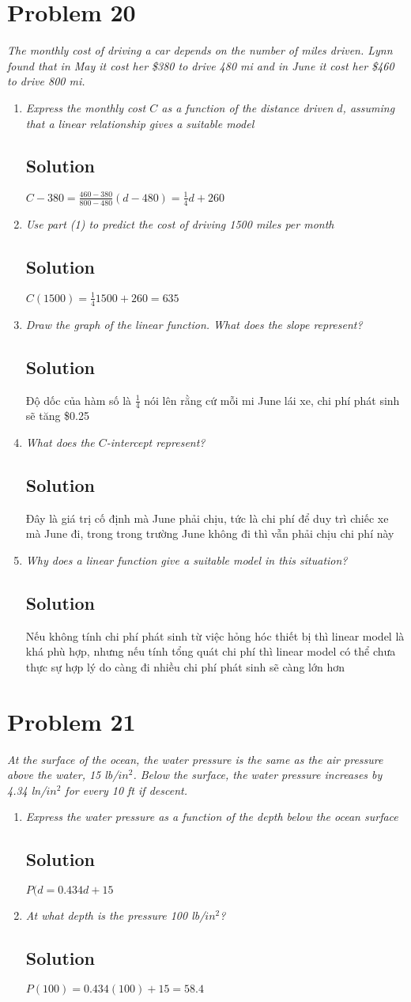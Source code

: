 \documentclass[11pt]{article}
\newcommand{\soln}{\subsection*}
\newcommand{\qn}{\textit}
\begin{document}
\section*{Problem 20}

\qn{The monthly cost of driving a car depends on the number of miles driven. Lynn found that in May it cost her \$380 to drive 480 mi and in June it cost her \$460 to drive 800 mi.}

\begin{enumerate}
	\item \qn{Express the monthly cost $C$ as a function of the distance driven $d$, assuming that a linear relationship gives a suitable model}
	\soln{Solution}
	$C-380=\frac{460-380}{800-480}(d-480)=\frac{1}{4}d+260$
	
	\item \qn{Use part (1) to predict the cost of driving 1500 miles per month}
	\soln{Solution}
	$C(1500)=\frac{1}{4}1500+260=635$
	
	\item \qn{Draw the graph of the linear function. What does the slope represent?}
	\soln{Solution}
	Độ dốc của hàm số là $\frac{1}{4}$ nói lên rằng cứ mỗi mi June lái xe, chi phí phát sinh sẽ tăng \$0.25
	
	\item \qn{What does the $C$-intercept represent?}
	\soln{Solution}
	Đây là giá trị cố định mà June phải chịu, tức là chi phí để duy trì chiếc xe mà June đi, trong trong trường June không đi thì vẫn phải chịu chi phí này
	
	\item \qn{Why does a linear function give a suitable model in this situation?}
	\soln{Solution}
	Nếu không tính chi phí phát sinh từ việc hỏng hóc thiết bị thì linear model là khá phù hợp, nhưng nếu tính tổng quát chi phí thì linear model có thể chưa thực sự hợp lý do càng đi nhiều chi phí phát sinh sẽ càng lớn hơn
\end{enumerate}

\section*{Problem 21}

\qn{At the surface of the ocean, the water pressure is the same as the air pressure above the water, 15 lb/$in^2$. Below the surface, the water pressure increases by 4.34 ln/$in^2$ for every 10 ft if descent.}

\begin{enumerate}
	\item \qn{Express the water pressure as a function of the depth below the ocean surface}
	\soln{Solution}
	$P(d=0.434d+15$
	
	\item \qn{At what depth is the pressure 100 lb/$in^2$?}
	\soln{Solution}
	$P(100)=0.434(100)+15=58.4$
\end{enumerate}
\end{document}
